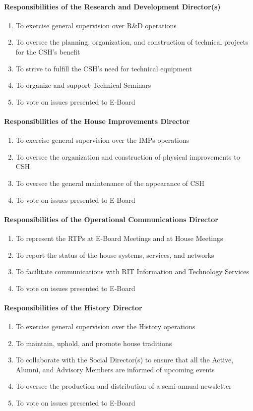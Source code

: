\documentclass{article}
\newcommand{\asubsubsection}[1]{\paragraph{#1} \label{#1}}
\begin{document}
\asubsubsection{Responsibilities of the Research and Development Director(s)}
\begin{enumerate}
	\item To exercise general supervision over R\&D operations
	\item To oversee the planning, organization, and construction of technical projects for the CSH's benefit
	\item To strive to fulfill the CSH's need for technical equipment
	\item To organize and support Technical Seminars
	\item To vote on issues presented to E-Board
\end{enumerate}

\asubsubsection{Responsibilities of the House Improvements Director}
\begin{enumerate}
	\item To exercise general supervision over the IMPs operations
	\item To oversee the organization and construction of physical improvements to CSH
	\item To oversee the general maintenance of the appearance of CSH
	\item To vote on issues presented to E-Board
\end{enumerate}

\asubsubsection{Responsibilities of the Operational Communications Director}
\begin{enumerate}
	\item To represent the RTPs at E-Board Meetings and at House Meetings
	\item To report the status of the house systems, services, and networks
	\item To facilitate communications with RIT Information and Technology Services
	\item To vote on issues presented to E-Board
\end{enumerate}

\asubsubsection{Responsibilities of the History Director}
\begin{enumerate}
	\item To exercise general supervision over the History operations
	\item To maintain, uphold, and promote house traditions
	\item To collaborate with the Social Director(s) to ensure that all the Active, Alumni, and Advisory Members are informed of upcoming events
	\item To oversee the production and distribution of a semi-annual newsletter
	\item To vote on issues presented to E-Board
\end{enumerate}
\end{document}
